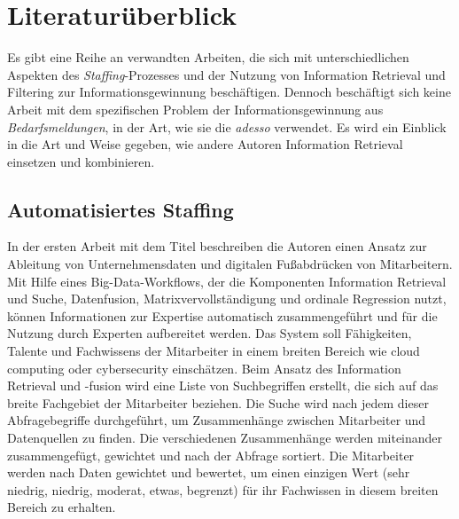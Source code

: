 \chapter{Literaturüberblick}
\label{sec:literaturueberblick}
Es gibt eine Reihe an verwandten Arbeiten, die sich mit unterschiedlichen Aspekten des \emph{Staffing}-Prozesses und der Nutzung von Information Retrieval und Filtering zur Informationsgewinnung beschäftigen. Dennoch beschäftigt sich keine Arbeit mit dem spezifischen Problem der Informationsgewinnung aus \emph{Bedarfsmeldungen}, in der Art, wie sie die \emph{adesso} verwendet. Es wird ein Einblick in die Art und Weise gegeben, wie andere Autoren Information Retrieval einsetzen und kombinieren.\\

\section{Automatisiertes Staffing}
In der ersten Arbeit mit dem Titel \cite{horesh2016information} beschreiben die Autoren \citeauthor{horesh2016information} einen Ansatz zur Ableitung von Unternehmensdaten und digitalen Fußabdrücken von Mitarbeitern. Mit Hilfe eines Big-Data-Workflows, der die Komponenten Information Retrieval und Suche, Datenfusion, Matrixvervollständigung und ordinale Regression nutzt, können Informationen zur Expertise automatisch zusammengeführt und für die Nutzung durch Experten aufbereitet werden. Das System soll Fähigkeiten, Talente und Fachwissens der Mitarbeiter in einem breiten Bereich wie cloud computing oder cybersecurity einschätzen. Beim Ansatz des Information Retrieval und -fusion wird eine Liste von Suchbegriffen erstellt, die sich auf das breite Fachgebiet der Mitarbeiter beziehen. Die Suche wird nach jedem dieser Abfragebegriffe durchgeführt, um Zusammenhänge zwischen Mitarbeiter und Datenquellen zu finden. Die verschiedenen Zusammenhänge werden miteinander zusammengefügt, gewichtet und nach der Abfrage sortiert. Die Mitarbeiter werden nach Daten gewichtet und bewertet, um einen einzigen Wert (sehr niedrig, niedrig, moderat, etwas, begrenzt) für ihr Fachwissen in diesem breiten Bereich zu erhalten.\\

